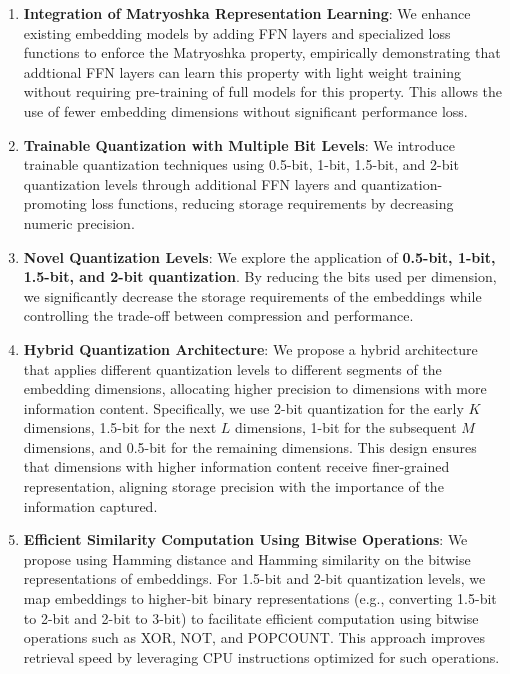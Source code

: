\begin{enumerate}  
    \item \textbf{Integration of Matryoshka Representation Learning}: We enhance existing embedding models by adding FFN layers and specialized loss functions to enforce the Matryoshka property, empirically demonstrating that addtional FFN layers can learn this property with light weight training without requiring pre-training of full models for this property. This allows the use of fewer embedding dimensions without significant performance loss.
  
    \item \textbf{Trainable Quantization with Multiple Bit Levels}: We introduce trainable quantization techniques using 0.5-bit, 1-bit, 1.5-bit, and 2-bit quantization levels through additional FFN layers and quantization-promoting loss functions, reducing storage requirements by decreasing numeric precision.  
  
    \item \textbf{Novel Quantization Levels}: We explore the application of \textbf{0.5-bit, 1-bit, 1.5-bit, and 2-bit quantization}. By reducing the bits used per dimension, we significantly decrease the storage requirements of the embeddings while controlling the trade-off between compression and performance.  
  
    \item \textbf{Hybrid Quantization Architecture}: We propose a hybrid architecture that applies different quantization levels to different segments of the embedding dimensions, allocating higher precision to dimensions with more information content. Specifically, we use 2-bit quantization for the early \( K \) dimensions, 1.5-bit for the next \( L \) dimensions, 1-bit for the subsequent \( M \) dimensions, and 0.5-bit for the remaining dimensions. This design ensures that dimensions with higher information content receive finer-grained representation, aligning storage precision with the importance of the information captured.
  
    \item \textbf{Efficient Similarity Computation Using Bitwise Operations}: We propose using Hamming distance and Hamming similarity on the bitwise representations of embeddings. For 1.5-bit and 2-bit quantization levels, we map embeddings to higher-bit binary representations (e.g., converting 1.5-bit to 2-bit and 2-bit to 3-bit) to facilitate efficient computation using bitwise operations such as XOR, NOT, and POPCOUNT. This approach improves retrieval speed by leveraging CPU instructions optimized for such operations.  
  
  
\end{enumerate}  

